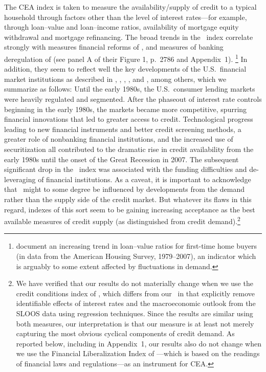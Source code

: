 \documentclass[titlepage]{\econtex}
\begin{document}
The CEA index is taken to measure the availability/supply of credit to a typical household through factors other than the level of interest rates---for example, through loan--value and loan--income ratios, availability of mortgage equity withdrawal and mortgage refinancing. The broad trends in the \CEA\ index correlate strongly with measures financial reforms of \cite{abiadEtAl_FinReforms}, and measures of banking deregulation of \cite{demyanykEtAl_JoF07_deregulation} (see panel A of their Figure 1, p.\ 2786 and Appendix~1).%
\footnote{  \cite{ducaEtAl_EJ11_housePrices} document an increasing trend in loan--value ratios for first-time home buyers (in data from the American Housing Survey, 1979--2007), an indicator which is arguably to some extent affected by fluctuations in demand.  } In addition, they seem to reflect well the key developments of the U.S.\ financial market institutions as described in \cite{mp02}, \cite{dynanEtAl_jme06}, \cite{gw07}, \cite{chDebt}, and \cite{admmmCredit}, among others, which we summarize as follows: Until the early 1980s, the U.S.\ consumer lending markets were heavily regulated and segmented. After the phaseout of interest rate controls beginning in the early 1980s, the markets became more competitive, spurring financial innovations that led to greater access to credit. Technological progress leading to new financial instruments and better credit screening methods, a greater role of nonbanking financial institutions, and the increased use of securitization all contributed to the dramatic rise in credit availability from the early 1980s until the onset of the Great Recession in 2007. The subsequent significant drop in the \CEA\ index was associated with the funding difficulties and de-leveraging of financial institutions. As a caveat, it is important to acknowledge that \CEA\ might to some degree be influenced by developments from the demand rather than the supply side of the credit market.  But whatever its flaws in this regard, indexes of this sort seem to be gaining increasing acceptance as the best available measures of credit supply (as distinguished from credit demand).\footnote{We have verified that our results do not materially change when we use the credit conditions index of \cite{ducaEtAl10_creditArch}, which differs from our \CEA\ in that \citeauthor{ducaEtAl10_creditArch} explicitly remove identifiable effects of interest rates and the macroeconomic outlook from the SLOOS data using regression techniques.  Since the results are similar using both measures, our interpretation is that our measure is at least not merely
capturing the most obvious cyclical components of credit demand. As reported below, including in Appendix~1, our results also do not change when we use the Financial Liberalization Index of \cite{abiadEtAl_FinReforms}---which is based on the readings of financial laws and regulations---as an instrument for CEA.}
\end{document}
